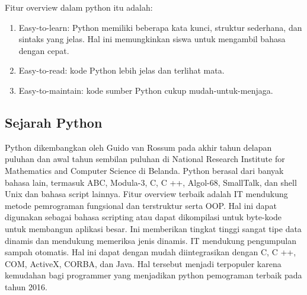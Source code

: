 Fitur overview dalam python itu adalah:
\begin {enumerate}
\item Easy-to-learn: Python memiliki beberapa kata kunci, struktur sederhana, dan sintaks yang jelas. $  $Hal ini memungkinkan siswa untuk mengambil bahasa dengan cepat.
\item Easy-to-read: kode Python lebih jelas dan terlihat mata.
\item Easy-to-maintain: kode sumber Python cukup mudah-untuk-menjaga.
\end {enumerate}

\subsection{Sejarah Python}
Python dikembangkan oleh Guido van Rossum pada akhir tahun delapan puluhan dan awal tahun sembilan puluhan di National Research Institute for Mathematics and Computer Science di Belanda. Python berasal dari banyak bahasa lain, termasuk ABC, Modula-3, C, C ++, Algol-68, SmallTalk, dan shell Unix dan bahasa script lainnya.
Fitur overview terbaik adalah IT mendukung metode pemrograman fungsional dan terstruktur serta OOP. Hal ini dapat digunakan sebagai bahasa scripting atau dapat dikompilasi untuk byte-kode untuk membangun aplikasi besar. Ini memberikan tingkat tinggi sangat tipe data dinamis dan mendukung memeriksa jenis dinamis. IT mendukung pengumpulan sampah otomatis. Hal ini dapat dengan mudah diintegrasikan dengan C, C ++, COM, ActiveX, CORBA, dan Java. Hal tersebut menjadi terpopuler karena kemudahan bagi programmer yang menjadikan python pemograman terbaik pada tahun 2016.

